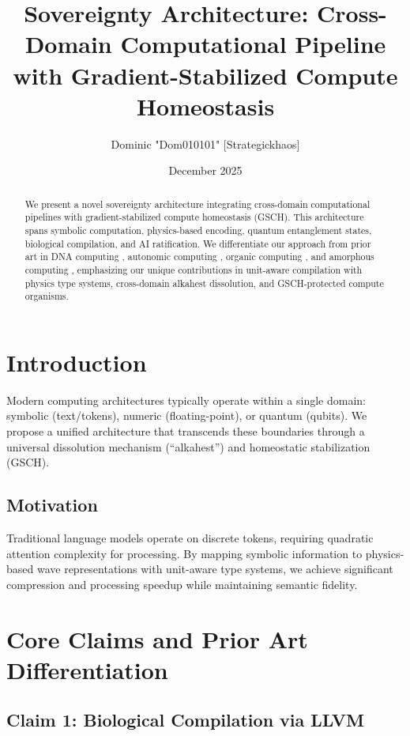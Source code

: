 \documentclass[11pt,a4paper]{article}
\title{Sovereignty Architecture: Cross-Domain Computational Pipeline with Gradient-Stabilized Compute Homeostasis}
\author{Dominic "Dom010101" [Strategickhaos]}
\date{December 2025}
\begin{document}
\maketitle

\begin{abstract}
We present a novel sovereignty architecture integrating cross-domain computational pipelines with gradient-stabilized compute homeostasis (GSCH). This architecture spans symbolic computation, physics-based encoding, quantum entanglement states, biological compilation, and AI ratification. We differentiate our approach from prior art in DNA computing \cite{adleman}, autonomic computing \cite{autonomic}, organic computing \cite{organic}, and amorphous computing \cite{amorphous}, emphasizing our unique contributions in unit-aware compilation with physics type systems, cross-domain alkahest dissolution, and GSCH-protected compute organisms.
\end{abstract}

\section{Introduction}

Modern computing architectures typically operate within a single domain: symbolic (text/tokens), numeric (floating-point), or quantum (qubits). We propose a unified architecture that transcends these boundaries through a universal dissolution mechanism (``alkahest'') and homeostatic stabilization (GSCH).

\subsection{Motivation}

Traditional language models operate on discrete tokens, requiring quadratic attention complexity for processing. By mapping symbolic information to physics-based wave representations with unit-aware type systems, we achieve significant compression and processing speedup while maintaining semantic fidelity.

\section{Core Claims and Prior Art Differentiation}

\subsection{Claim 1: Biological Compilation via LLVM}
\end{document}
